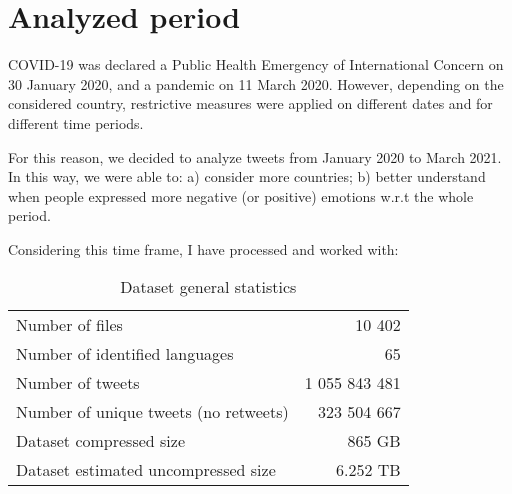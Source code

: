 \section{Analyzed period}
\label{sec:period}
COVID-19 was declared a Public Health Emergency of International Concern on 30 January 2020, and a pandemic on 11 March 2020. However, depending on the considered country, restrictive measures were applied on different dates and for different time periods. 

For this reason, we decided to analyze tweets from January 2020 to March 2021. In this way, we were able to: a) consider more countries; b) better understand when people expressed more negative (or positive) emotions w.r.t the whole period.

Considering this time frame, I have processed and worked with:

\begin{table}[H]
    \centering
    \begin{tabular}{lr}
        Number of files & 10 402
        \\
        Number of identified languages & 65
        \\
        Number of tweets & 1 055 843 481
        \\
        Number of unique tweets (no retweets) & 323 504 667
        \\
        Dataset compressed size & 865 GB
        \\
        Dataset estimated uncompressed size & 6.252 TB
    \end{tabular}
    \caption{Dataset general statistics}
    \label{tab:dataset-stats}
\end{table}

